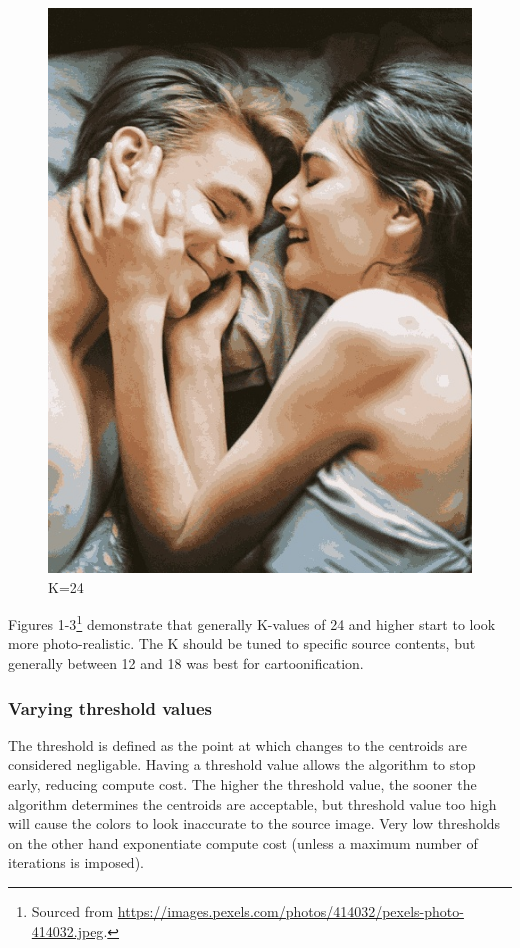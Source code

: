\documentclass[11pt]{article}
\begin{document}
\begin{figure}
  \includegraphics[width=\linewidth]{figures/lovers_K=24.jpg}
  \caption{K=24}
\end{figure}

Figures 1-3\footnote{Sourced from \url{https://images.pexels.com/photos/414032/pexels-photo-414032.jpeg}.}
demonstrate that generally K-values of 24 and higher start to look more photo-realistic.
The K should be tuned to specific source contents, but generally between 12 and 18 was best for cartoonification.

\subsubsection{Varying threshold values}

The threshold is defined as the point at which changes to the centroids are considered negligable.
Having a threshold value allows the algorithm to stop early, reducing compute cost.
The higher the threshold value, the sooner the algorithm determines the centroids are acceptable,
but threshold value too high will cause the colors to look inaccurate to the source image.
Very low thresholds on the other hand exponentiate compute cost (unless a maximum number of iterations is imposed).
\end{document}
